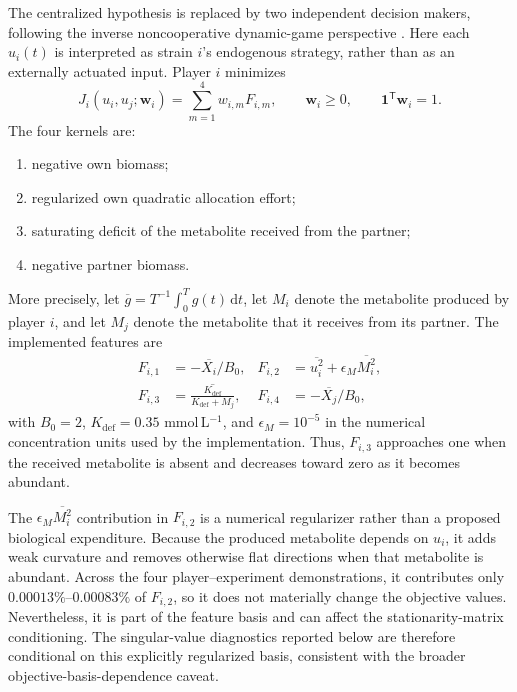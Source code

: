 \documentclass[11pt,a4paper]{article}
\newcommand{\vect}[1]{\boldsymbol{#1}}
\begin{document}
The centralized hypothesis is replaced by two independent decision makers,
following the inverse noncooperative dynamic-game perspective
\cite{Molloy2022}. Here each \(u_i(t)\) is interpreted as strain \(i\)'s
endogenous strategy, rather than as an externally actuated input. Player \(i\)
minimizes
\begin{equation}
  J_i(u_i,u_j;\vect{w}_i)
  =
  \sum_{m=1}^{4}w_{i,m}F_{i,m},
  \qquad
  \vect{w}_i\ge0,\qquad
  \vect{1}^{\mathsf T}\vect{w}_i=1.
\end{equation}
The four kernels are:
\begin{enumerate}
  \item negative own biomass;
  \item regularized own quadratic allocation effort;
  \item saturating deficit of the metabolite received from the partner;
  \item negative partner biomass.
\end{enumerate}
More precisely, let
\(\overline{g}=T^{-1}\int_0^T g(t)\,\mathrm{d}t\), let \(M_i\) denote the
metabolite produced by player \(i\), and let \(M_j\) denote the metabolite
that it receives from its partner. The implemented features are
\begin{align}
  F_{i,1} &= -\overline{X_i}/B_0,
  &
  F_{i,2} &= \overline{u_i^2}
             +\epsilon_M\overline{M_i^2},\\
  F_{i,3} &= \overline{\frac{K_{\mathrm{def}}}
                                  {K_{\mathrm{def}}+M_j}},
  &
  F_{i,4} &= -\overline{X_j}/B_0,
\end{align}
with \(B_0=2\), \(K_{\mathrm{def}}=0.35\) mmol\,L\(^{-1}\), and
\(\epsilon_M=10^{-5}\) in the numerical concentration units used by the
implementation. Thus, \(F_{i,3}\) approaches one when the received metabolite
is absent and decreases toward zero as it becomes abundant.

The \(\epsilon_M\overline{M_i^2}\) contribution in \(F_{i,2}\) is a numerical
regularizer rather than a proposed biological expenditure. Because the
produced metabolite depends on \(u_i\), it adds weak curvature and removes
otherwise flat directions when that metabolite is abundant. Across the four
player--experiment demonstrations, it contributes only
\(0.00013\%\)--\(0.00083\%\) of \(F_{i,2}\), so it does not materially change
the objective values. Nevertheless, it is part of the feature basis and can
affect the stationarity-matrix conditioning. The singular-value diagnostics
reported below are therefore conditional on this explicitly regularized
basis, consistent with the broader objective-basis-dependence caveat.
\end{document}
